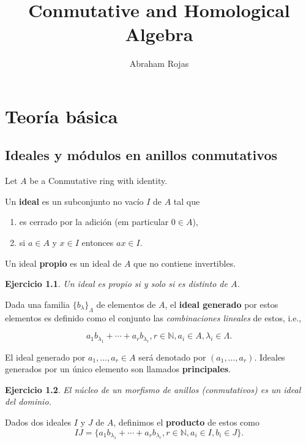 \documentclass[12pt]{book}
\newtheorem{ex}{Ejercicio}
\begin{document}
\large
\title{Conmutative and Homological Algebra}	
	\author{Abraham Rojas}
	\date{ }
	
	\maketitle
	\tableofcontents

	

	
	
\part{Teoría básica}	
	
	
\chapter{Ideales y módulos en anillos conmutativos}

Let $A$ be a Conmutative ring with identity.

Un \textbf{ideal} es un subconjunto no vacío $I$ de $A$ tal que 
\begin{enumerate} 
\item es cerrado por la adición (em particular $0\in A$),
\item si $a\in A$ y $x\in I$ entonces $ax\in I$.
\end{enumerate}

Un ideal \textbf{propio} es un ideal de $A$ que no contiene invertibles.

\begin{ex}
Un ideal es propio si y solo si es distinto de $A$.
\end{ex}

Dada una familia $\{b_\lambda\}_\Lambda$ de elementos de $A$, el \textbf{ideal generado} por estos elementos es definido como el conjunto las \textit{combinaciones lineales} de estos, i.e.,

$$  a_1 b_{\lambda_1} + \cdots + a_r b_{\lambda_r},  r \in \mathbb{N} , a_i \in A , \lambda_i \in \Lambda.  $$

El ideal generado por $a_1, \ldots , a_r \in A $ será denotado por $(a_1, \ldots , a_r)$. Ideales generados por un único elemento son llamados \textbf{principales}.

\begin{ex}
El núcleo de un morfismo de anillos (conmutativos) es un ideal del dominio.
\end{ex}

Dados dos ideales $I$ y $J$ de $A$, definimos el \textbf{producto} de estos como $$ I J = \{a_1 b_{\lambda_1} + \cdots + a_r b_{\lambda_r},  r \in \mathbb{N} , a_i \in I , b_i \in J\}. $$
\end{document}
